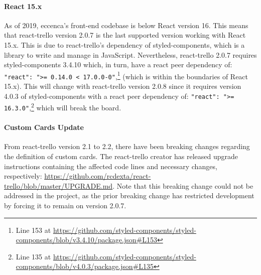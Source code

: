 \paragraph{React 15.x} As of 2019, eccenca’s front-end codebase is below React version 16. This means that react-trello version 2.0.7 is the last supported version working with React 15.x. This is due to react-trello’s dependency of styled-components, which is a library to write and manage  in JavaScript. Nevertheless, react-trello 2.0.7 requires styled-components 3.4.10 which, in turn, have a react peer dependency of: \texttt{"react": ">= 0.14.0 < 17.0.0-0"},\footnote{Line 153 at \url{https://github.com/styled-components/styled-components/blob/v3.4.10/package.json\#L153}} (which is within the boundaries of React 15.x). This will change with react-trello version 2.0.8 since it requires version 4.0.3 of styled-components with a react peer dependency of: \texttt{"react": ">= 16.3.0"},\footnote{Line 135 at \url{https://github.com/styled-components/styled-components/blob/v4.0.3/package.json\#L135}} which will break the board.

\paragraph{Custom Cards Update} From react-trello version 2.1 to 2.2, there have been breaking changes regarding the definition of custom cards. The react-trello creator has released upgrade instructions containing the affected code lines and necessary changes, respectively: \url{https://github.com/rcdexta/react-trello/blob/master/UPGRADE.md}. Note that this breaking change could not be addressed in the project, as the prior breaking change has restricted development by forcing it to remain on version 2.0.7.













